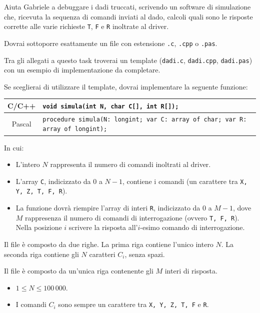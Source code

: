 Aiuta Gabriele a debuggare i dadi truccati, scrivendo un software di simulazione che, ricevuta la sequenza di comandi inviati al dado, calcoli quali sono le risposte corrette alle varie richieste \texttt{T}, \texttt{F} e \texttt{R} inoltrate al driver.

\Implementation
Dovrai sottoporre esattamente un file con estensione \texttt{.c}, \texttt{.cpp} o \texttt{.pas}.

\begin{warning}
Tra gli allegati a questo task troverai un template (\texttt{dadi.c}, \texttt{dadi.cpp}, \texttt{dadi.pas}) con un esempio di implementazione da completare.
\end{warning}

Se sceglierai di utilizzare il template, dovrai implementare la seguente funzione:
\begin{center}\begin{tabularx}{\textwidth}{|c|X|}
\hline
C/C++  & \verb|void simula(int N, char C[], int R[]);|\\
\hline
Pascal & \verb|procedure simula(N: longint; var C: array of char; var R: array of longint);|\\
\hline
\end{tabularx}\end{center}
In cui:
\begin{itemize}[nolistsep]
  \item L'intero $N$ rappresenta il numero di comandi inoltrati al driver.
  \item L'array \texttt{C}, indicizzato da $0$ a $N-1$, contiene i comandi (un carattere tra \texttt{X, Y, Z, T, F, R}).
  \item La funzione dovrà riempire l'array di interi \texttt{R}, indicizzato da $0$ a $M-1$, dove $M$ rappresenza il numero di comandi di interrogazione (ovvero \texttt{T, F, R}). Nella posizione $i$ scrivere la risposta all'$i$-esimo comando di interrogazione.
\end{itemize}

\InputFile
Il file  è composto da due righe. La prima riga contiene l'unico intero $N$. La seconda riga contiene gli $N$ caratteri $C_i$, senza spazi.

\OutputFile
Il file \outputfile{} è composto da un'unica riga contenente gli $M$ interi di risposta.

\Constraints
\begin{itemize}[nolistsep, itemsep=2mm]
	\item $1 \le N \le 100\,000$.
	\item I comandi $C_i$ sono sempre un carattere tra \texttt{X, Y, Z, T, F} e \texttt{R}.
\end{itemize}

